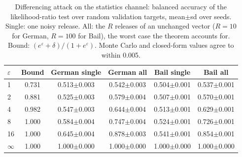 \begin{table}[tbp]
\centering
\footnotesize
\caption{Differencing attack on the statistics channel: balanced accuracy of the likelihood-ratio test over random validation targets, mean$\pm$sd over seeds. Single: one noisy release. All: the $R$ releases of an unchanged vector ($R=10$ for German, $R=100$ for Bail), the worst case the theorem accounts for. Bound: $(e^{\varepsilon}+\delta)/(1+e^{\varepsilon})$. Monte Carlo and closed-form values agree to within 0.005.}
\label{tab:privacy_attack}
\begin{tabular}{lccccc}
\toprule
$\varepsilon$ & Bound & German single & German all & Bail single & Bail all \\
\midrule
1 & 0.731 & 0.513$\pm$0.003 & 0.542$\pm$0.003 & 0.504$\pm$0.001 & 0.537$\pm$0.001 \\
2 & 0.881 & 0.525$\pm$0.003 & 0.579$\pm$0.004 & 0.507$\pm$0.001 & 0.570$\pm$0.001 \\
4 & 0.982 & 0.547$\pm$0.003 & 0.644$\pm$0.004 & 0.513$\pm$0.001 & 0.629$\pm$0.001 \\
8 & 1.000 & 0.584$\pm$0.004 & 0.747$\pm$0.004 & 0.524$\pm$0.001 & 0.726$\pm$0.001 \\
16 & 1.000 & 0.645$\pm$0.004 & 0.878$\pm$0.003 & 0.541$\pm$0.001 & 0.854$\pm$0.001 \\
$\infty$ & 1.000 & 1.000$\pm$0.000 & 1.000$\pm$0.000 & 1.000$\pm$0.000 & 1.000$\pm$0.000 \\
\bottomrule
\end{tabular}
\end{table}
